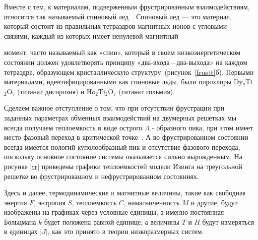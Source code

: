Вместе с тем, к материалам, подверженным фрустрированным взаимодействиям, относится так называемый спиновый лед~\cite{diep2013,bramwell2001,kohli2011,harris1997}. Спиновый лед --- это материал, который состоит из правильных тетраэдров магнитных ионов с угловыми связями, каждый из которых имеет ненулевой магнитный


\noindent момент, часто называемый как «спин», который в своем низкоэнергетическом состоянии должен удовлетворять принципу «два-входа---два-выхода» на каждом тетраэдре, образующем кристаллическую структуру~(рисунок~\ref{frustt}б). Первыми материалами, идентифицированными как спиновые льды, были пирохлоры Dy$_2$Ti$_2$O$_7$ (титанат диспрозия) и Ho$_2$Ti$_2$O$_7$ (титанат гольмия).

Сделаем важное отступление о том, что при отсутствии фрустрации при заданных параметрах обменных взаимодействий на двумерных решетках мы всегда получаем теплоемкость в виде острого $\Lambda$ - образного пика, при этом имеет место фазовый переход в критической точке~\cite{peierls1936}. А во фрустрированном состоянии всегда имеется пологий куполообразный пик и отсутствие фазового перехода, поскольку основное состояние системы оказывается сильно вырожденным. На рисунке \ref{tr} приведены графики теплоемкостей модели Изинга на треугольной решетке во фрустрированном и нефрустрированном состояниях.

Здесь и далее, термодинамические и магнитные величины, такие как свободная энергия $F$, энтропия $S$, теплоемкость $C$, намагниченность $M$ и другие, будут изображены на графиках через условные единицы, а именно постоянная Больцмана $k$ будет положена равной единице, а величины $T$ и $H$ будут измеряться в единицах $|J|$, как это принято в теории низкоразмерных систем.

